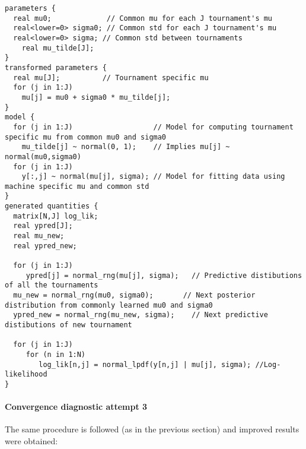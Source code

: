 \documentclass[11pt]{article}
\begin{document}
    \begin{verbatim}
parameters {
  real mu0;             // Common mu for each J tournament's mu
  real<lower=0> sigma0; // Common std for each J tournament's mu
  real<lower=0> sigma; // Common std between tournaments
    real mu_tilde[J];
}
transformed parameters {
  real mu[J];          // Tournament specific mu
  for (j in 1:J)
    mu[j] = mu0 + sigma0 * mu_tilde[j];
}
model {
  for (j in 1:J)                   // Model for computing tournament specific mu from common mu0 and sigma0
    mu_tilde[j] ~ normal(0, 1);    // Implies mu[j] ~ normal(mu0,sigma0)
  for (j in 1:J)
    y[:,j] ~ normal(mu[j], sigma); // Model for fitting data using machine specific mu and common std
}
generated quantities {
  matrix[N,J] log_lik;    
  real ypred[J];
  real mu_new;
  real ypred_new;
  
  for (j in 1:J)
     ypred[j] = normal_rng(mu[j], sigma);   // Predictive distibutions of all the tournaments
  mu_new = normal_rng(mu0, sigma0);       // Next posterior distribution from commonly learned mu0 and sigma0
  ypred_new = normal_rng(mu_new, sigma);    // Next predictive distibutions of new tournament
  
  for (j in 1:J)
     for (n in 1:N)
        log_lik[n,j] = normal_lpdf(y[n,j] | mu[j], sigma); //Log-likelihood
}
\end{verbatim}

\hypertarget{convergence-diagnostic-attempt-3}{%
\paragraph{Convergence diagnostic attempt
3}\label{convergence-diagnostic-attempt-3}}

The same procedure is followed (as in the previous section) and improved
results were obtained:
\end{document}
